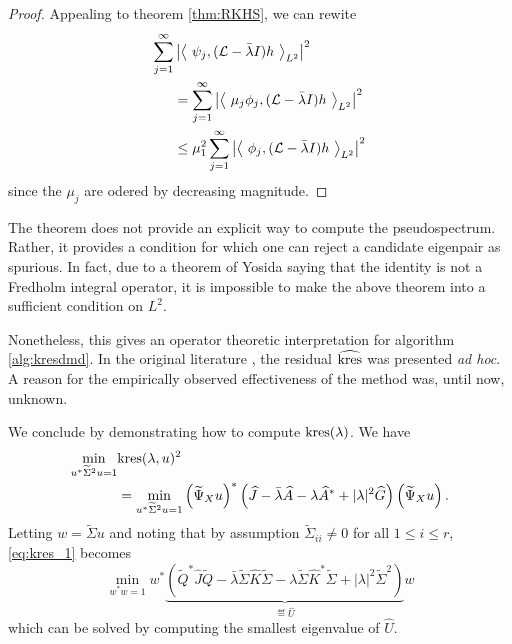 \begin{proof}
    Appealing to theorem \ref{thm:RKHS}, we can rewite
    \begin{equation}
        \begin{split}
            \sum_{j=1}^{\infty} & \left| \left\langle\ 
            \psi_j, (\scrL - \bar{\lambda} I) h 
        \ \right\rangle_{L^2} \right|^2 \\
        &= \sum_{j=1}^{\infty} \left| \left\langle\ 
            \mu_j \phi_j, (\scrL - \bar{\lambda} I) h 
        \ \right\rangle_{L^2} \right|^2 \\
        &\leq \mu_1^2 \sum_{j=1}^{\infty} \left| \left\langle\ 
            \phi_j, (\scrL - \bar{\lambda} I) h 
        \ \right\rangle_{L^2} \right|^2
        \end{split}
    \end{equation}
    since the $\mu_j$ are odered by decreasing magnitude. 
\end{proof}

The theorem does not provide an explicit way to compute the pseudospectrum. Rather, 
it provides a condition for which one can reject a candidate eigenpair as spurious. 
In fact, due to a theorem of Yosida saying that the identity is not a Fredholm integral 
operator, it is impossible to make the above theorem into a sufficient condition on $L^2$. 

Nonetheless, this gives an operator theoretic interpretation for algorithm 
\ref{alg:kresdmd}. In the original literature \cite{kresdmd}, the residual 
$\widehat{ \text{kres} }$ was presented \emph{ad hoc}. A reason for the empirically observed 
effectiveness of the method was, until now, unknown. 

We conclude by demonstrating how to compute $\text{kres} (\lambda)$. We have 
\begin{align}
    \min_{u^* \widetilde{ \Sigma }^2 u = 1} &\text{kres} (\lambda, u)^2 \\
    &= \min_{u^* \widetilde{ \Sigma }^2 u = 1} \left( \widetilde{\Psi}_X u \right)^* \left( 
        \widehat{ J } 
        - \bar{\lambda} \widehat{ A } 
        - \lambda \widehat{ A }^* 
        + | \lambda |^2 \widehat{ G }
    \right) \left( \widetilde{\Psi}_X u \right) . \label{eq:kres_1}
\end{align}
Letting $w = \widetilde{ \Sigma } u$ and noting that by assumption 
$\widetilde{ \Sigma }_{i i} \neq 0$ for all $1 \leq i \leq r$, \ref{eq:kres_1} becomes 
\begin{equation}
    \min_{w^* w = 1} w^* \underbrace{\left( 
        \widetilde{ Q }^* \widehat{ J } \widetilde{ Q }
        - \bar{\lambda} \widetilde{ \Sigma } \widehat{ K } \widetilde{ \Sigma }
        - \lambda \widetilde{ \Sigma } \widehat{ K }^* \widetilde{ \Sigma }
        + | \lambda |^2 \widetilde{ \Sigma }^2
    \right)}_{
        \eqdef \widehat{ U }
    } w \label{eq:kres_2}
\end{equation}
which can be solved by computing the smallest eigenvalue of $\widehat{ U }$. 

